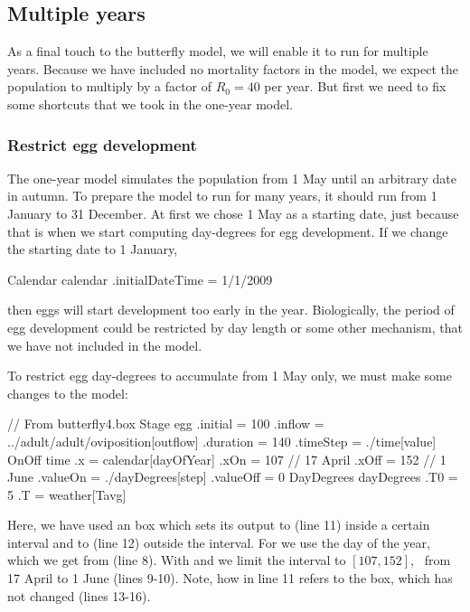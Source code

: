 \subsection{Multiple years}
As a final touch to the butterfly model, we will enable it to run for multiple years. Because we have included no mortality factors in the model, we expect the population to multiply by a factor of $R_0=40$ per year. But first we need to fix some shortcuts that we took in the one-year model.

\subsubsection{Restrict egg development}
The one-year model simulates the population from 1 May until an arbitrary date in autumn. To prepare the model to run for many years, it should run from 1 January to 31 December. At first we chose 1 May as a starting date, just because that is when we start computing day-degrees for egg development. If we change the starting date to 1 January,
\begin{boxscript}
Calendar calendar {
  .initialDateTime = 1/1/2009 
}
\end{boxscript}
then eggs will start development too early in the year. Biologically, the period of egg development could be restricted by day length or some other mechanism, that we have not included in the model.

To restrict egg day-degrees to accumulate from 1 May only, we must make some changes to the  model:

\lstset{numbers=left}
\begin{boxscript}
// From butterfly4.box
Stage egg {
  .initial = 100 
  .inflow = ../adult/adult/oviposition[outflow] 
  .duration = 140
  .timeStep = ./time[value] 
  OnOff time { 
    .x = calendar[dayOfYear]
    .xOn = 107    // 17 April
    .xOff = 152   //  1 June
    .valueOn = ./dayDegrees[step]
    .valueOff = 0
    DayDegrees dayDegrees {
      .T0 = 5
      .T = weather[Tavg]
    }
  }
}
\end{boxscript}
\lstset{numbers=none}

Here, we have used an  box which sets its output  to  (line 11) inside a certain  interval and to  (line 12) outside the  interval. For  we use the day of the year, which we get from  (line 8). With  and  we limit the interval to $[107,152]$, \ie\ from 17 April  to 1 June (lines 9-10). Note, how  in line 11 refers to the  box, which  has not changed (lines 13-16).

